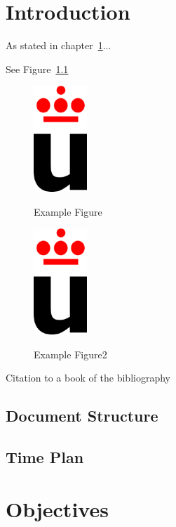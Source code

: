 \documentclass[a4paper, 12pt]{book}
\begin{document}
\chapter{Introduction}
\label{chap:intro}

As stated in chapter~\ref{chap:intro}...

See Figure~\ref{fig:logo}

\begin{figure}[h!]
  \centering
  \includegraphics[width=2cm, keepaspectratio]{img/logo_vect.eps}
  \label{fig:logo}
  \caption{Example Figure}
\end{figure}

\begin{figure}[h!]
  \centering
  \includegraphics[width=2cm, keepaspectratio]{img/logo_vect.eps}
  \label{fig:logo2}
  \caption{Example Figure2}
\end{figure}

Citation to a book of the bibliography~\cite{LutzPPy}

\section{Document Structure}
\label{sec:structure}

\section{Time Plan}
\label{sec:planification}


\chapter{Objectives}
\label{chap:objectives}
\end{document}
